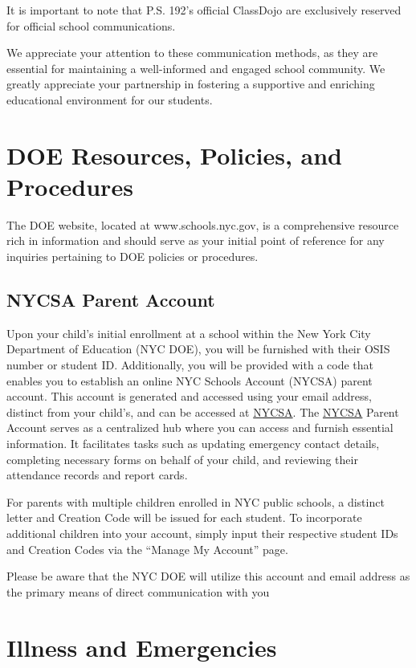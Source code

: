 \documentclass[letterpaper, 11pt]{article}
\begin{document}
It is important to note that P.S. 192’s official ClassDojo are exclusively reserved for official school communications.

We appreciate your attention to these communication methods, as they are essential for maintaining a well-informed and engaged school community. We greatly appreciate your partnership in fostering a supportive and enriching educational environment for our students.

\section{DOE Resources, Policies, and Procedures}
\label{sec:orgeedbe7f}
The DOE website, located at www.schools.nyc.gov, is a comprehensive resource rich in information and should serve as your initial point of reference for any inquiries pertaining to DOE policies or procedures.

\subsection{NYCSA Parent Account}
\label{sec:org2fe31dd}
Upon your child’s initial enrollment at a school within the New York City Department of Education (NYC DOE), you will be furnished with their OSIS number or student ID. Additionally, you will be provided with a code that enables you to establish an online NYC Schools Account (NYCSA) parent account. This account is generated and accessed using your email address, distinct from your child’s, and can be accessed at \href{https://www.schoolsaccount.nyc/}{NYCSA}. The  \href{https://www.schoolsaccount.nyc/}{NYCSA} Parent Account serves as a centralized hub where you can access and furnish essential information. It facilitates tasks such as updating emergency contact details, completing necessary forms on behalf of your child, and reviewing their attendance records and report cards.

For parents with multiple children enrolled in NYC public schools, a distinct letter and Creation Code will be issued for each student. To incorporate additional children into your account, simply input their respective student IDs and Creation Codes via the ``Manage My Account'' page.

Please be aware that the NYC DOE will utilize this account and email address as the primary means of direct communication with you

\section{Illness and Emergencies}
\label{sec:org7babb28}
\end{document}
